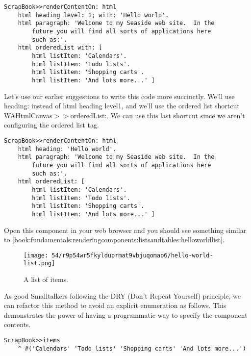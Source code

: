 \documentclass[a4paper,10pt,twoside]{book}
\newcommand{\ct}[1]{{\small\ttfamily\textup{#1}}}
\begin{document}
\begin{lstlisting}
ScrapBook>>renderContentOn: html
    html heading level: 1; with: 'Hello world'.
    html paragraph: 'Welcome to my Seaside web site.  In the
        future you will find all sorts of applications here
        such as:'.
    html orderedList with: [
        html listItem: 'Calendars'.
        html listItem: 'Todo lists'.
        html listItem: 'Shopping carts'.
        html listItem: 'And lots more...' ]
\end{lstlisting}

Let's use our earlier suggestions to write this code more succinctly. We'll use \ct{heading:} instead of \ct{html heading level1}, and we'll use the ordered list shortcut  \ct{WAHtmlCanvas$>$$>$orderedList:}. We can use this last shortcut since we aren't configuring the ordered list tag.

\begin{lstlisting}
ScrapBook>>renderContentOn: html
    html heading: 'Hello world'.
    html paragraph: 'Welcome to my Seaside web site.  In the
        future you will find all sorts of applications here
        such as:'.
    html orderedList: [
        html listItem: 'Calendars'.
        html listItem: 'Todo lists'.
        html listItem: 'Shopping carts'.
        html listItem: 'And lots more...' ]
\end{lstlisting}

Open this component in your web browser and you should see something similar to \autoref{book:fundamentals:renderingcomponents:listsandtables:helloworldlist}.

\begin{figure}[h!tbp]
	\begin{center}
		\texttt{[image: 54/r9p54wr5fkylduprmat9vbjuqomao6/hello-world-list.png]}
		\caption{A list of items.\label{book:fundamentals:renderingcomponents:listsandtables:helloworldlist}}
	\end{center}
\end{figure}


As good Smalltalkers following the DRY (Don't Repeat Yourself) principle, we can refactor this method to avoid an explicit enumeration as follows. This demonstrates the power of having a programmatic way to specify the component contents.

\begin{lstlisting}
ScrapBook>>items
    ^ #('Calendars' 'Todo lists' 'Shopping carts' 'And lots more...')
\end{lstlisting}
\end{document}

